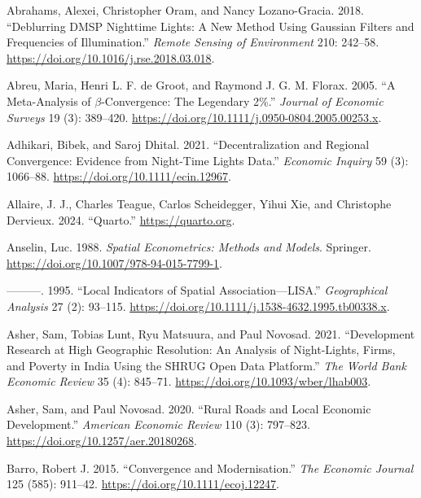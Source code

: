 \documentclass[
  letterpaper,
  DIV=11,
  numbers=noendperiod]{scrartcl}
\newlength{\cslhangindent}
\newenvironment{CSLReferences}[2] %
 {\begin{list}{}{%
  \setlength{\itemindent}{0pt}
  \setlength{\leftmargin}{0pt}
  \setlength{\parsep}{0pt}
  \ifodd #1
   \setlength{\leftmargin}{\cslhangindent}
   \setlength{\itemindent}{-1\cslhangindent}
  \fi
  \setlength{\itemsep}{#2\baselineskip}}}
 {\end{list}}
\begin{document}
\label{refs}
\begin{CSLReferences}{1}{0}
Abrahams, Alexei, Christopher Oram, and Nancy Lozano-Gracia. 2018.
{``Deblurring {DMSP} Nighttime Lights: A New Method Using {Gaussian}
Filters and Frequencies of Illumination.''} \emph{Remote Sensing of
Environment} 210: 242--58.
\url{https://doi.org/10.1016/j.rse.2018.03.018}.

Abreu, Maria, Henri L. F. de Groot, and Raymond J. G. M. Florax. 2005.
{``A Meta-Analysis of \(\beta\)-Convergence: The Legendary 2\%.''}
\emph{Journal of Economic Surveys} 19 (3): 389--420.
\url{https://doi.org/10.1111/j.0950-0804.2005.00253.x}.

Adhikari, Bibek, and Saroj Dhital. 2021. {``Decentralization and
Regional Convergence: Evidence from Night-Time Lights Data.''}
\emph{Economic Inquiry} 59 (3): 1066--88.
\url{https://doi.org/10.1111/ecin.12967}.

Allaire, J. J., Charles Teague, Carlos Scheidegger, Yihui Xie, and
Christophe Dervieux. 2024. {``Quarto.''} \url{https://quarto.org}.

Anselin, Luc. 1988. \emph{Spatial Econometrics: Methods and Models}.
Springer. \url{https://doi.org/10.1007/978-94-015-7799-1}.

---------. 1995. {``Local Indicators of Spatial Association---{LISA}.''}
\emph{Geographical Analysis} 27 (2): 93--115.
\url{https://doi.org/10.1111/j.1538-4632.1995.tb00338.x}.

Asher, Sam, Tobias Lunt, Ryu Matsuura, and Paul Novosad. 2021.
{``Development Research at High Geographic Resolution: An Analysis of
Night-Lights, Firms, and Poverty in {India} Using the {SHRUG} Open Data
Platform.''} \emph{The World Bank Economic Review} 35 (4): 845--71.
\url{https://doi.org/10.1093/wber/lhab003}.

Asher, Sam, and Paul Novosad. 2020. {``Rural Roads and Local Economic
Development.''} \emph{American Economic Review} 110 (3): 797--823.
\url{https://doi.org/10.1257/aer.20180268}.

Barro, Robert J. 2015. {``Convergence and Modernisation.''} \emph{The
Economic Journal} 125 (585): 911--42.
\url{https://doi.org/10.1111/ecoj.12247}.


\end{CSLReferences}
\end{document}
